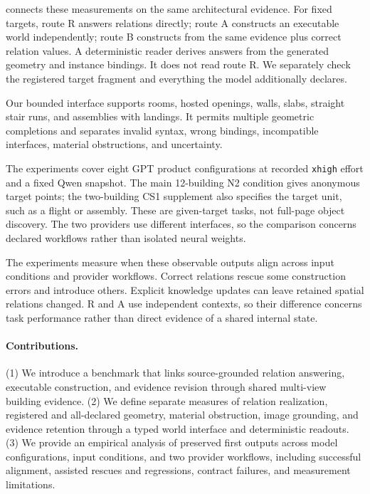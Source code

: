 \tw{} connects these measurements on the same architectural evidence.
For fixed targets, route R answers relations directly; route A constructs
an executable world independently; route B constructs from the same
evidence plus correct relation values. A deterministic reader derives
answers from the generated geometry and instance bindings. It does not
read route R. We separately check the registered target fragment and
everything the model additionally declares.

Our bounded interface supports rooms, hosted openings, walls, slabs,
straight stair runs, and assemblies with landings. It permits multiple
geometric completions and separates invalid syntax, wrong bindings,
incompatible interfaces, material obstructions, and uncertainty.

The experiments cover eight GPT product configurations at recorded
\texttt{xhigh} effort and a fixed Qwen snapshot. The main 12-building N2
condition gives anonymous target points; the two-building CS1 supplement
also specifies the target unit, such as a flight or assembly. These are
given-target tasks, not full-page object discovery. The two providers use
different interfaces, so the comparison concerns declared workflows rather
than isolated neural weights.

The experiments measure when these observable outputs align across
input conditions and provider workflows. Correct relations rescue some
construction errors and introduce others. Explicit knowledge updates can
leave retained spatial relations changed. R and A use independent
contexts, so their difference concerns task performance rather than
direct evidence of a shared internal state.

\paragraph{Contributions.}
(1) We introduce a benchmark that links source-grounded relation
answering, executable construction, and evidence revision through
shared multi-view building evidence.
(2) We define separate measures of relation realization, registered and
all-declared geometry, material obstruction, image grounding, and evidence
retention through a typed world interface and deterministic readouts.
(3) We provide an empirical analysis of preserved first outputs across
model configurations, input conditions, and two provider workflows,
including successful alignment, assisted rescues and regressions,
contract failures, and measurement limitations.


